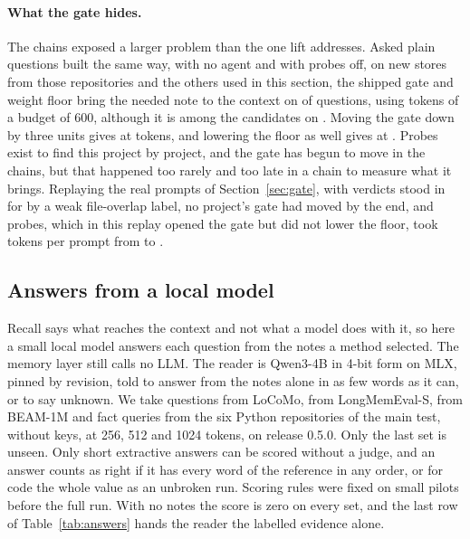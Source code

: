 \paragraph{What the gate hides.} The chains exposed a larger problem than the one lift addresses. Asked plain questions built the same way, with no agent and with probes off, on new stores from those repositories and the others used in this section, the shipped gate and weight floor bring the needed note to the context on  of  questions, using  tokens of a budget of 600, although it is among the candidates on . Moving the gate down by three units gives  at  tokens, and lowering the floor as well gives  at . Probes exist to find this project by project, and the gate has begun to move in the chains, but that happened too rarely and too late in a chain to measure what it brings. Replaying the real prompts of Section~\ref{sec:gate}, with verdicts stood in for by a weak file-overlap label, no project's gate had moved by the end, and probes, which in this replay opened the gate but did not lower the floor, took tokens per prompt from  to .

\subsection{Answers from a local model}\label{sec:answers}
Recall says what reaches the context and not what a model does with it, so here a small local model answers each question from the notes a method selected. The memory layer still calls no LLM. The reader is Qwen3-4B in 4-bit form on MLX, pinned by revision, told to answer from the notes alone in as few words as it can, or to say unknown. We take  questions from LoCoMo,  from LongMemEval-S,  from BEAM-1M and  fact queries from the six Python repositories of the main test, without keys, at 256, 512 and 1024 tokens, on release 0.5.0. Only the last set is unseen. Only short extractive answers can be scored without a judge, and an answer counts as right if it has every word of the reference in any order, or for code the whole value as an unbroken run. Scoring rules were fixed on small pilots before the full run. With no notes the score is zero on every set, and the last row of Table~\ref{tab:answers} hands the reader the labelled evidence alone.

